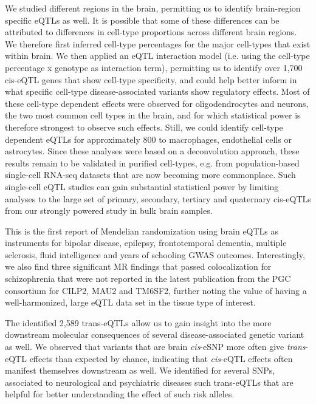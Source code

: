 We studied different regions in the brain, permitting us to identify brain-region specific eQTLs as well. It is possible that some of these differences can be attributed to differences in cell-type proportions across different brain regions. We therefore first inferred cell-type percentages for the major cell-types that exist within brain. We then applied an eQTL interaction model (i.e. using the cell-type percentage x genotype as interaction term), permitting us to identify over 1,700 cis-eQTL genes that show cell-type specificity, and could help better inform in what specific cell-type disease-associated variants show regulatory effects. Most of these cell-type dependent effects were observed for oligodendrocytes and neurons, the two most common cell types in the brain, and for which statistical power is therefore strongest to observe such effects. Still, we could identify cell-type dependent eQTLs for approximately 800 to macrophages, endothelial cells or astrocytes. Since these analyses were based on a deconvolution approach, these results remain to be validated in purified cell-types, e.g. from population-based single-cell RNA-seq datasets that are now becoming more commonplace\cite{wijstSinglecellRNASequencing2018,PopulationscaleSinglecellRNAseq}. Such single-cell eQTL studies can gain substantial statistical power by limiting analyses to the large set of primary, secondary, tertiary and quaternary cis-eQTLs from our strongly powered study in bulk brain samples. 

This is the first report of Mendelian randomization using brain eQTLs as instruments for bipolar disease, epilepsy, frontotemporal dementia, multiple sclerosis, fluid intelligence and years of schooling GWAS outcomes. Interestingly, we also find three significant MR findings that passed colocalization for schizophrenia that were not reported in the latest publication from the PGC consortium for CILP2, MAU2 and TM6SF2\cite{consortiumMappingGenomicLoci2020}, further noting the value of having a well-harmonized, large eQTL data set in the tissue type of interest.  

The identified 2,589 trans-eQTLs allow us to gain insight into the more downstream molecular consequences of several disease-associated genetic variant as well. We observed that variants that are brain \emph{cis}-eSNP more often give \emph{trans}-eQTL effects than expected by chance, indicating that \emph{cis}-eQTL effects often manifest themselves downstream as well. We identified for several SNPs, associated to neurological and psychiatric diseases such trans-eQTLs that are helpful for better understanding the effect of such risk alleles. 

